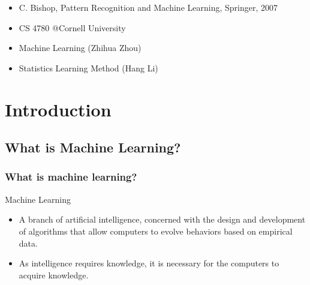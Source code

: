\documentclass[9pt]{beamer}
\begin{document}
\begin{CJK*}{GBK}{kai}
\begin{frame}
\begin{itemize}
		\item C. Bishop, Pattern Recognition and Machine Learning, Springer, 2007
		
		\item CS 4780 @Cornell University
		
		\item Machine Learning (Zhihua Zhou)%
		
		\item Statistics Learning Method (Hang Li)%
		
	\end{itemize}
\end{frame}


\section{Introduction}
\subsection{What is Machine Learning?}
\begin{frame}
\frametitle{What is machine learning?}
\begin{block}{Machine Learning}
\begin{itemize}
	
	\item A branch of artificial intelligence, concerned with the design and development of algorithms that allow computers to evolve behaviors based on empirical data.
	
	\item As intelligence requires knowledge, it is necessary for the computers to acquire knowledge.
	
	
\end{itemize}
\end{block}


\end{frame}
\end{CJK*}
\end{document}
